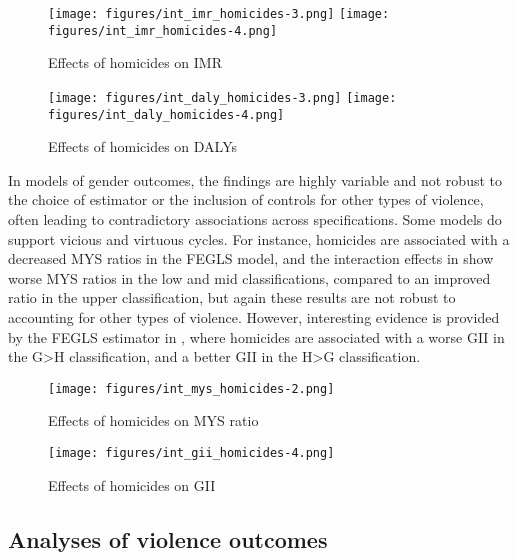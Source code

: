 \documentclass[12pt]{article}
\begin{document}
\begin{figure}[!htb]
    \centering
    \caption{Effects of homicides on IMR}
    \label{int_imr_homicides}
    \texttt{[image: figures/int\_imr\_homicides-3.png]}
    \texttt{[image: figures/int\_imr\_homicides-4.png]}
\end{figure}

\begin{figure}[!htb]
    \centering
    \caption{Effects of homicides on DALYs}
    \label{int_daly_homicides}
    \texttt{[image: figures/int\_daly\_homicides-3.png]}
    \texttt{[image: figures/int\_daly\_homicides-4.png]}
\end{figure}

In models of gender outcomes, the findings are highly variable and not robust to the choice of estimator or the inclusion of controls for other types of violence, often leading to contradictory associations across specifications.
Some models do support vicious and virtuous cycles.
For instance, homicides are associated with a decreased MYS ratios in the FEGLS model, and the interaction effects in  show worse MYS ratios in the low and mid classifications, compared to an improved ratio in the upper classification, but again these results are not robust to accounting for other types of violence.
However, interesting evidence is provided by the FEGLS estimator in , where homicides are associated with a worse GII in the G>H classification, and a better GII in the H>G classification.

\begin{figure}[!htb]
    \centering
    \caption{Effects of homicides on MYS ratio}
    \label{int_mys_homicides}
    \texttt{[image: figures/int\_mys\_homicides-2.png]}
\end{figure}
\begin{figure}[!htb]
    \centering
    \caption{Effects of homicides on GII}
    \label{int_gii_homicides}
    \texttt{[image: figures/int\_gii\_homicides-4.png]}
\end{figure}

\clearpage

\clearpage

\subsection{Analyses of violence outcomes}
\label{results_violence}
\end{document}
